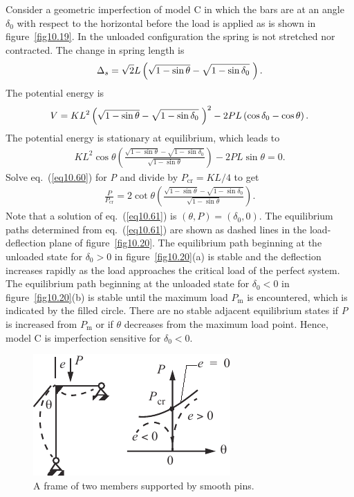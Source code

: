 \documentclass{AeroStructure-ERJohnson}
\begin{document}
Consider a geometric imperfection of model C in which the bars are at an angle $\delta_{0}$ with respect to the horizontal before the load is applied as is shown in figure~\ref{fig10.19}. In the unloaded configuration the spring is not stretched nor contracted. The change in spring length is
\begin{align}\label{eq10.58}
\Delta_{s}=\sqrt{2} L\left(\sqrt{1-\sin \theta}-\sqrt{1-\sin \delta_{0}}\hspace*{3pt}\right).
\end{align}
The potential energy is
\begin{align}\label{eq10.59}
V=K L^{2}\left(\sqrt{1-\sin \theta}-\sqrt{1-\sin \delta_{0}}\hspace*{3pt}\right)^{2}-2 P L\left(\cos \delta_{0}-\cos \theta\right).
\end{align}
The potential energy is stationary at equilibrium, which leads to
\begin{align}\label{eq10.60}
K L^{2} \cos \theta\left(\frac{\sqrt{1-\sin \theta}-\sqrt{1-\sin \delta_{0}}}{\sqrt{1-\sin \theta}}\right)-2 P L \sin \theta=0.
\end{align}
Solve eq.~(\ref{eq10.60}) for \textit{P} and divide by $P_{\mathrm{cr}}=K L / 4$ to get\enlargethispage{1\baselineskip}
\begin{align}\label{eq10.61}
\frac{P}{P_{\mathrm{cr}}}=2 \cot \theta\left(\frac{\sqrt{1-\sin \theta}-\sqrt{1-\sin \delta_{0}}}{\sqrt{1-\sin \theta}}\right).
\end{align}
Note that a solution of eq.~(\ref{eq10.61}) is $(\theta, P)=\left(\delta_{0}, 0\right)$. The equilibrium paths determined from eq.~(\ref{eq10.61}) are shown as dashed lines in the load-deflection plane of figure~\ref{fig10.20}. The equilibrium path beginning at the\vadjust{\pagebreak} unloaded state for $\delta_{0}>0$ in figure~\ref{fig10.20}(a) is stable and the deflection increases rapidly as the load approaches the critical load of the perfect system. The equilibrium path beginning at the unloaded state for $\delta_{0}<0$ in figure~\ref{fig10.20}(b) is stable until the maximum load $P_{\mathrm{m}}$ is encountered, which is indicated by the filled circle. There are no stable adjacent equilibrium states if \textit{P} is increased from $P_{\mathrm{m}}$ or if $\theta$ decreases from the maximum load point. Hence, model C is imperfection sensitive for $\delta_{0}<0$.


\begin{figure}
\vspace{-19pt}
\includegraphics{Figure_10-21.pdf}
\caption{A frame of two members supported by smooth pins.\label{fig10.21}}
\end{figure}
\end{document}
